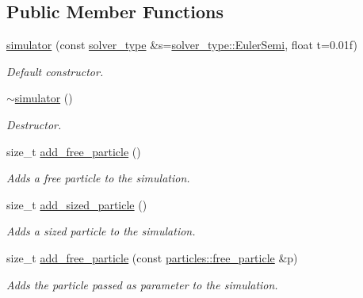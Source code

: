 \subsection*{Public Member Functions}
\begin{DoxyCompactItemize}
\item 
\hyperlink{classphysim_1_1simulator_ae89aeb2287bbf9bbb482f448e2ac375a}{simulator} (const \hyperlink{namespacephysim_a09adeda29c09e651877e880d31fc9686}{solver\+\_\+type} \&s=\hyperlink{namespacephysim_a09adeda29c09e651877e880d31fc9686a1855dee0fffde2f4ed8ef6c4a0420b30}{solver\+\_\+type\+::\+Euler\+Semi}, float t=0.\+01f)
\begin{DoxyCompactList}\small\item\em Default constructor. \end{DoxyCompactList}\item 
\mbox{\label{classphysim_1_1simulator_af4b2f525e544e0b642683d2260bb9c1a}} 
\hyperlink{classphysim_1_1simulator_af4b2f525e544e0b642683d2260bb9c1a}{$\sim$simulator} ()
\begin{DoxyCompactList}\small\item\em Destructor. \end{DoxyCompactList}\item 
size\+\_\+t \hyperlink{classphysim_1_1simulator_a6d2b636673f895b006724a6ba310e322}{add\+\_\+free\+\_\+particle} ()
\begin{DoxyCompactList}\small\item\em Adds a free particle to the simulation. \end{DoxyCompactList}\item 
size\+\_\+t \hyperlink{classphysim_1_1simulator_ae36d99f98f5e470934eea0523ffca583}{add\+\_\+sized\+\_\+particle} ()
\begin{DoxyCompactList}\small\item\em Adds a sized particle to the simulation. \end{DoxyCompactList}\item 
size\+\_\+t \hyperlink{classphysim_1_1simulator_adc50e1ec0da019bf120db3ae5af27d39}{add\+\_\+free\+\_\+particle} (const \hyperlink{classphysim_1_1particles_1_1free__particle}{particles\+::free\+\_\+particle} \&p)
\begin{DoxyCompactList}\small\item\em Adds the particle passed as parameter to the simulation. \end{DoxyCompactList}\item 

\end{DoxyCompactItemize}
